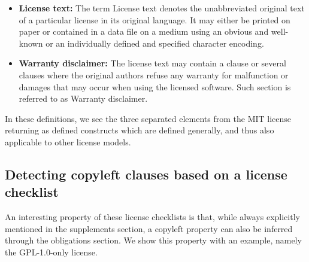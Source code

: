 \begin{itemize}
	\item \textbf{License text:} The term License text denotes the unabbreviated original text of a particular license in its original language. It may either be printed on paper or contained in a data file on a medium using an obvious and well-known or an individually defined and specified character encoding.
	\item \textbf{Warranty disclaimer:} The license text may contain a clause or several clauses where the original authors refuse any warranty for malfunction or damages that may occur when using the licensed software. Such section is referred to as Warranty disclaimer.
\end{itemize}

In these definitions, we see the three separated elements from the MIT license returning as defined constructs which are defined generally, and thus also applicable to other license models.

\subsection{Detecting copyleft clauses based on a license checklist}

An interesting property of these license checklists is that, while always explicitly mentioned in the supplements section, a copyleft property can also be inferred through the obligations section. We show this property with an example, namely the GPL-1.0-only license.


